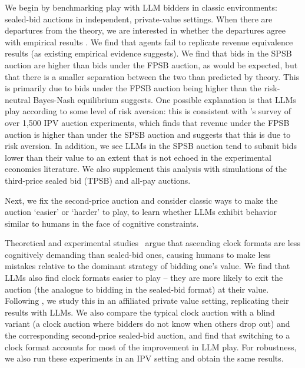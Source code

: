 \documentclass{article} %
\begin{document}
We begin by benchmarking play with LLM bidders in classic environments: sealed-bid auctions in independent, private-value settings. When there are departures from the theory, we are interested in whether the departures agree with empirical results \citep{kagel1993independent, kagel2020handbook}. We find that agents fail to replicate revenue equivalence results (as existing empirical evidence suggests). We find that bids in the SPSB auction are higher than bids under the FPSB auction, as would be expected, but that there is a smaller separation between the two than predicted by theory. This is primarily due to bids under the FPSB auction being higher than the risk-neutral Bayes-Nash equilibrium suggests. One possible explanation is that LLMs play according to some level of risk aversion: this is consistent with \citet{cox1988theory}'s survey of over 1,500 IPV auction experiments, which finds that revenue under the FPSB auction is higher than under the SPSB auction and suggests that this is due to risk aversion. In addition, we see LLMs in the SPSB auction tend to submit bids lower than their value to an extent that is not echoed in the experimental economics literature. We also supplement this analysis with simulations of the third-price sealed bid (TPSB) and all-pay auctions.

Next, we fix the second-price auction and consider classic ways to make the auction `easier' or `harder' to play, to learn whether LLMs exhibit behavior similar to humans in the face of cognitive constraints. 

Theoretical and experimental studies~\citep{li2017obviously} argue that ascending clock formats are less cognitively demanding than sealed-bid ones, causing humans to make less mistakes relative to the dominant strategy of bidding one's value. We find that LLMs also find clock formats easier to play -- they are more likely to exit the auction (the analogue to bidding in the sealed-bid format) at their value. Following \citet{li2017obviously}, we study this in an affiliated private value setting, replicating their results with LLMs. We also compare the typical clock auction with a blind variant (a clock auction where bidders do not know when others drop out) and the corresponding second-price sealed-bid auction, and find that switching to a clock format accounts for most of the improvement in LLM play. For robustness, we also run these experiments in an IPV setting and obtain the same results.
\end{document}
